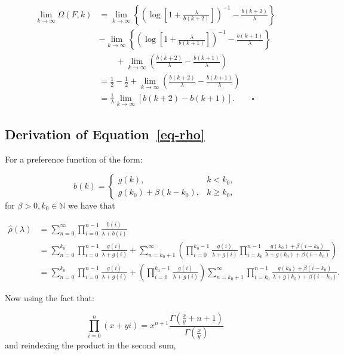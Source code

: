 \documentclass[
  sn-basic,
]{sn-jnl}
\theoremstyle{plain}
\theoremstyle{plain}
\theoremstyle{remark}
\begin{document}
\begin{align*}
\lim_{k\rightarrow\infty}\Omega(F,k) &= \lim_{k\rightarrow\infty}\left\{ \left(\log\left[1+\frac{\lambda}{b(k+2)}\right]\right)^{-1}-\frac{b(k+2)}{\lambda}\right\} \\&- \lim_{k\rightarrow\infty}\left\{ \left(\log\left[1+\frac{\lambda}{b(k+1)}\right]\right)^{-1}-\frac{b(k+1)}{\lambda}\right\}\\
&\qquad+\lim_{k\rightarrow\infty}\left(\frac{b(k+2)}{\lambda}-\frac{b(k+1)}{\lambda}\right)\\
&=\frac{1}{2}-\frac{1}{2} + \lim_{k\rightarrow\infty}\left(\frac{b(k+2)}{\lambda}-\frac{b(k+1)}{\lambda}\right)\\
&=\frac{1}{\lambda}\lim_{k\rightarrow\infty}\left[b(k+2)-b(k+1)\right].\qquad \square
\end{align*}

\subsection{\texorpdfstring{Derivation of
Equation~\ref{eq-rho}}{Derivation of Equation~}}\label{derivation-of-eq-rho}

For a preference function of the form:

\[
b(k) = \begin{cases}
g(k),&k<k_0,\\
g(k_0) + \beta(k-k_0), &k\ge k_0,
\end{cases}
\] for \(\beta>0, k_0\in\mathbb N\) we have that

\begin{align*}
\hat\rho(\lambda) &= \sum_{n=0}^\infty\prod_{i=0}^{n-1}\frac{b(i)}{\lambda+b(i)}\\ &= \sum_{n=0}^{k_0}\prod_{i=0}^{n-1}\frac{g(i)}{\lambda+g(i)} + \sum_{n=k_0+1}^\infty\left(\prod_{i=0}^{k_0-1}\frac{g(i)}{\lambda+g(i)}\prod_{i=k_0}^{n-1}\frac{g(k_0) + \beta(i-k_0)}{\lambda +g(k_0) + \beta(i-k_0)}\right)\\
&=\sum_{n=0}^{k_0}\prod_{i=0}^{n-1}\frac{g(i)}{\lambda+g(i)} + \left(\prod_{i=0}^{k_0-1}\frac{g(i)}{\lambda+g(i)}\right)\sum_{n=k_0+1}^\infty\prod_{i=k_0}^{n-1}\frac{g(k_0) + \beta(i-k_0)}{\lambda +g(k_0) + \beta(i-k_0)}.
\end{align*}

Now using the fact that:

\[
\prod_{i=0}^n(x+yi) = x^{n+1}\frac{\Gamma(\frac{x}{y}+n+1)}{\Gamma(\frac{x}{y})}
\] and reindexing the product in the second sum,
\end{document}
